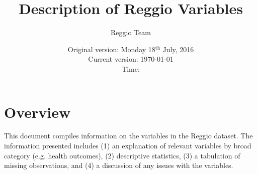 




\title{Description of Reggio Variables}
\author{Reggio Team}
\date{Original version: Monday 18$^{\text{th}}$ July, 2016 \\ Current version: \today \\ \vspace{1em} Time: \currenttime}
\maketitle

\tableofcontents

\doublespace

\section{Overview}
\label{sec:overview}
This document compiles information on the variables in the Reggio dataset. The information presented includes (1) an explanation of relevant variables by broad category (e.g. health outcomes), (2) descriptive statistics, (3) a tabulation of missing observations, and (4) a discussion of any issues with the variables. 
\clearpage








